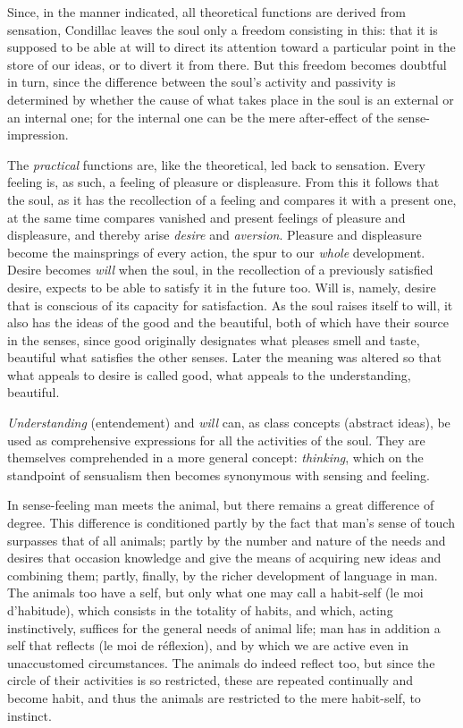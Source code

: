 Since, in the manner indicated, all theoretical functions are derived
from sensation, Condillac leaves the soul only a freedom consisting in
this: that it is supposed to be able at will to direct its attention
toward a particular point in the store of our ideas, or to divert it
from there. But this freedom becomes doubtful in turn, since the
difference between the soul's activity and passivity is determined by
whether the cause of what takes place in the soul is an external
or an internal one; for the internal one can be the mere after-effect of
the sense-impression.

The \emph{practical} functions are, like the theoretical, led back to
sensation. Every feeling is, as such, a feeling of pleasure or
displeasure. From this it follows that the soul, as it has the
recollection of a feeling and compares it with a present one, at the
same time compares vanished and present feelings of pleasure and
displeasure, and thereby arise \emph{desire} and
\emph{aversion}. Pleasure and displeasure become the mainsprings of
every action, the spur to our \emph{whole} development. Desire becomes
\emph{will} when the soul, in the recollection of a previously
satisfied desire, expects to be able to satisfy it in the future too.
Will is, namely, desire that is conscious of its capacity for
satisfaction. As the soul raises itself to will, it also has the ideas
of the good and the beautiful, both of which have their source in the
senses, since good originally designates what pleases smell and taste,
beautiful what satisfies the other senses. Later the meaning was
altered so that what appeals to desire is called good, what appeals to
the understanding, beautiful.

\emph{Understanding} (entendement) and \emph{will} can, as class
concepts (abstract ideas), be used as comprehensive expressions for all
the activities of the soul. They are themselves comprehended in a more
general concept: \emph{thinking}, which on the standpoint of sensualism
then becomes synonymous with sensing and feeling.

In sense-feeling man meets the animal, but there remains a great
difference of degree. This difference is conditioned partly by the fact
that man's sense of touch surpasses that of all animals; partly by the
number and nature of the needs and desires that occasion knowledge and
give the means of acquiring new ideas and combining them; partly,
finally, by the richer development of language in man. The animals too
have a self, but only what one may call a habit-self (le moi
d'habitude), which consists in the totality of habits, and which, acting
instinctively, suffices for the general needs of animal life; man has
in addition a self that reflects
(le moi de réflexion), and by which we are active even in unaccustomed
circumstances. The animals do indeed reflect too, but since the circle
of their activities is so restricted, these are repeated continually
and become habit, and thus the animals are restricted to the mere
habit-self, to instinct.

